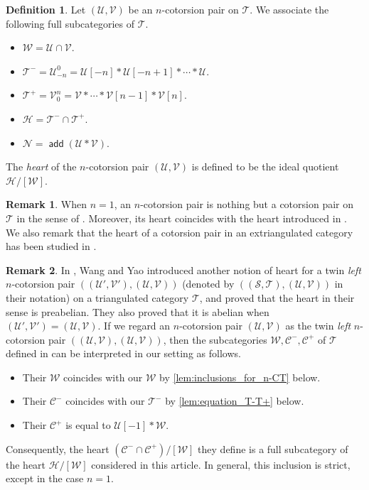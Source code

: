 \documentclass[a4paper,reqno,10pt]{amsart}
\theoremstyle{definition}
\newtheorem{definition}[definition]{Definition}
\theoremstyle{definition}
\newtheorem{remark}[remark]{Remark}
\theoremstyle{definition}
\theoremstyle{definition}
\theoremstyle{plain}
\def\add{\operatorname{\mathsf{add}}}
\newcommand{\CC}{\mathcal{C}}
\newcommand{\CH}{\mathcal{H}}
\newcommand{\CN}{\mathcal{N}}
\newcommand{\CS}{\mathcal{S}}
\newcommand{\CT}{\mathcal{T}}
\newcommand{\CU}{\mathcal{U}}
\newcommand{\CV}{\mathcal{V}}
\newcommand{\CW}{\mathcal{W}}
\begin{document}
\normalcolor

\begin{definition}\label{def:heart}
Let $(\CU,\CV)$ be an $n$-cotorsion pair on $\CT$. %
We associate the following full subcategories of $\CT$.
\begin{itemize}
\item $\CW=\CU\cap\CV$.
\item $\CT^-=\CU_{-n}^0=\CU[-n]\ast\CU[-n+1]\ast\cdots\ast\CU$.
\item $\CT^+=\CV_0^n=\CV\ast\cdots\ast\CV[n-1]\ast\CV[n]$.
\item $\CH=\CT^-\cap\CT^+$.
\item $\CN=\add(\CU\ast\CV)$.
\end{itemize}
\color{blue}
The \emph{heart} of the $n$-cotorsion pair $(\CU,\CV)$ is defined to be the ideal quotient $\CH/[\CW]$.
\normalcolor
\end{definition}



\begin{remark}
When $n=1$, an $n$-cotorsion pair is nothing but a cotorsion pair on $\CT$ in the sense of \cite[Definition~2.1]{Nak11}. Moreover, its heart coincides with the heart introduced in \cite[Definition~3.7]{Nak11}.
\color{blue}
We also remark that the heart of a cotorsion pair in an extriangulated category has been studied in \cite{LN19}.
\normalcolor
\end{remark}

\color{blue}
\begin{remark}
In \cite{WY25}, Wang and Yao introduced another notion of heart for a twin
\emph{left} $n$-cotorsion pair $((\CU',\CV'),(\CU,\CV))$ (denoted by $((\CS,\CT),(\CU,\CV))$ in their notation) on a triangulated category $\CT$, and proved that the
heart in their sense is preabelian. They also proved that it is abelian
when $(\CU',\CV')=(\CU,\CV)$. If we regard an $n$-cotorsion pair
$(\CU,\CV)$ as the twin \emph{left} $n$-cotorsion pair
$((\CU,\CV),(\CU,\CV))$, then the subcategories
$\CW,\CC^-,\CC^+$ of $\CT$ defined in
\cite[Definition~2.2]{WY25} can be interpreted in our setting as follows.
\begin{itemize}
\item Their $\CW$ coincides with our $\CW$ by
\cref{lem:inclusions_for_n-CT} below.
\item Their $\CC^-$ coincides with our $\CT^-$ by
\cref{lem:equation_T-T+} below.
\item Their $\CC^+$ is equal to $\CU[-1]\ast\CW$.
\end{itemize}
Consequently, the heart $(\CC^-\cap\CC^+)/[\CW]$ they define is a full subcategory of the heart
$\CH/[\CW]$ considered in this article. In general, this inclusion is
strict, except in the case $n=1$.
\end{remark}
\normalcolor
\end{document}

